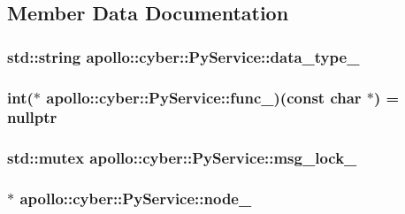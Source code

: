 \subsection{Member Data Documentation}
\hypertarget{classapollo_1_1cyber_1_1PyService_a513217bf46b0b77682301c3455cfe4b2}{
\subsubsection[{data\-\_\-type\-\_\-}]{\setlength{\rightskip}{0pt plus 5cm}std\-::string apollo\-::cyber\-::\-Py\-Service\-::data\-\_\-type\-\_\-\hspace{0.3cm}{\ttfamily [private]}}}\label{classapollo_1_1cyber_1_1PyService_a513217bf46b0b77682301c3455cfe4b2}
\hypertarget{classapollo_1_1cyber_1_1PyService_a2d5b481af42ce71251792b280b489fd6}{
\subsubsection[{func\-\_\-}]{\setlength{\rightskip}{0pt plus 5cm}int($\ast$ apollo\-::cyber\-::\-Py\-Service\-::func\-\_\-)(const char $\ast$) = nullptr\hspace{0.3cm}{\ttfamily [private]}}}\label{classapollo_1_1cyber_1_1PyService_a2d5b481af42ce71251792b280b489fd6}
\hypertarget{classapollo_1_1cyber_1_1PyService_a072867c4addabd216a1570ef47fa32b9}{
\subsubsection[{msg\-\_\-lock\-\_\-}]{\setlength{\rightskip}{0pt plus 5cm}std\-::mutex apollo\-::cyber\-::\-Py\-Service\-::msg\-\_\-lock\-\_\-\hspace{0.3cm}{\ttfamily [private]}}}\label{classapollo_1_1cyber_1_1PyService_a072867c4addabd216a1570ef47fa32b9}
\hypertarget{classapollo_1_1cyber_1_1PyService_a07c8fc13734dc16f9e904bc968e8b625}{
\subsubsection[{node\-\_\-}]{$\ast$ apollo\-::cyber\-::\-Py\-Service\-::node\-\_\-\hspace{0.3cm}{\ttfamily [private]}}}\label{classapollo_1_1cyber_1_1PyService_a07c8fc13734dc16f9e904bc968e8b625}
